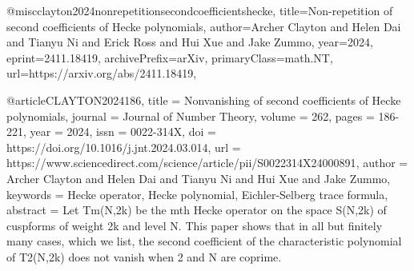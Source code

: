 @misc{clayton2024nonrepetitionsecondcoefficientshecke,
      title={Non-repetition of second coefficients of Hecke polynomials}, 
      author={Archer Clayton and Helen Dai and Tianyu Ni and Erick Ross and Hui Xue and Jake Zummo},
      year={2024},
      eprint={2411.18419},
      archivePrefix={arXiv},
      primaryClass={math.NT},
      url={https://arxiv.org/abs/2411.18419}, 
}

@article{CLAYTON2024186,
title = {Nonvanishing of second coefficients of Hecke polynomials},
journal = {Journal of Number Theory},
volume = {262},
pages = {186-221},
year = {2024},
issn = {0022-314X},
doi = {https://doi.org/10.1016/j.jnt.2024.03.014},
url = {https://www.sciencedirect.com/science/article/pii/S0022314X24000891},
author = {Archer Clayton and Helen Dai and Tianyu Ni and Hui Xue and Jake Zummo},
keywords = {Hecke operator, Hecke polynomial, Eichler-Selberg trace formula},
abstract = {Let Tm(N,2k) be the mth Hecke operator on the space S(N,2k) of cuspforms of weight 2k and level N. This paper shows that in all but finitely many cases, which we list, the second coefficient of the characteristic polynomial of T2(N,2k) does not vanish when 2 and N are coprime.}
}